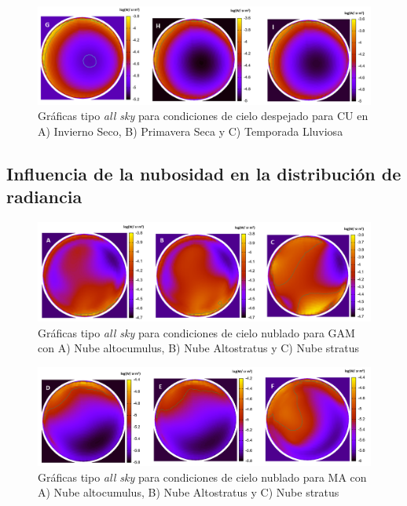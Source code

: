 \begin{figure}[H]
  \centering
    \includegraphics[width=1\textwidth]{4}
  \caption{Gráficas tipo \textit{all sky} para condiciones de cielo despejado para CU en A) Invierno Seco, B) Primavera Seca y C) Temporada Lluviosa} 
  \label{4}
\end{figure}

\newpage

\subsection{Influencia de la nubosidad en la distribución de radiancia}

\begin{figure}[H]
  \centering
    \includegraphics[width=1\textwidth]{5}
  \caption{Gráficas tipo \textit{all sky} para condiciones de cielo nublado para GAM con A) Nube altocumulus, B) Nube Altostratus y C) Nube stratus} 
  \label{5}
\end{figure}

\begin{figure}[H]
  \centering
    \includegraphics[width=1\textwidth]{6}
  \caption{Gráficas tipo \textit{all sky} para condiciones de cielo nublado para MA con A) Nube altocumulus, B) Nube Altostratus y C) Nube stratus} 
  \label{6}
\end{figure}

